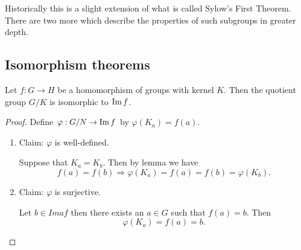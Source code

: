 Historically this is a slight extension of what is called Sylow's First Theorem. There are
 two more which describe the properties of such subgroups in greater depth.

\subsection{Isomorphism theorems}

\begin{theorem}
    Let $f:G \to H$ be a homomorphism of groups with kernel $K$. Then the quotient group $G/K$ is 
    isomorphic to $\operatorname{Im} f$.
\end{theorem}
\begin{proof}
    Define $\varphi : G/N \to \operatorname{Im} f$ by $\varphi(K_a) = f(a)$. 

    \begin{figure}[ht]
        \centering
    \end{figure}

    \begin{enumerate}
    
    \item Claim: $\varphi$ is well-defined.
    
    Suppose that $K_a = K_b$. Then by lemma we have 
    \[
        f(a) = f(b) \Longrightarrow \varphi(K_a) = f(a) = f(b) = \varphi(K_b).
    \]

    \item Claim: $\varphi$ is surjective. 

    Let $b \in Ima f$ then there exists an $a \in G$ such that $f(a) = b$. Then 
    \[
        \varphi(K_a) = f(a) = b.
    \]


\end{enumerate}
\end{proof}
